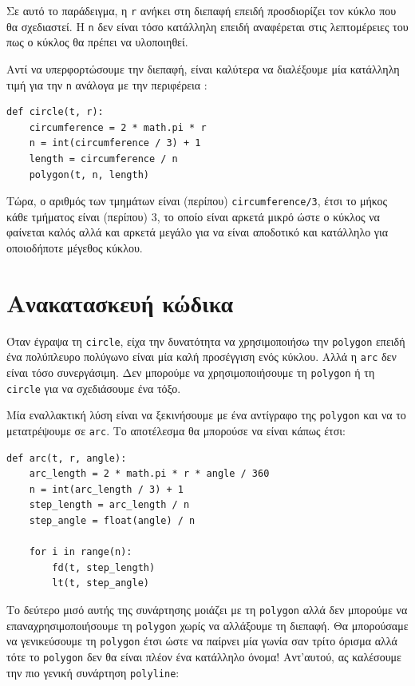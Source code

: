 \documentclass[10pt]{book}
\begin{document}
Σε αυτό το παράδειγμα, η {\tt r} ανήκει στη διεπαφή επειδή προσδιορίζει τον κύκλο που θα σχεδιαστεί. Η {\tt n} δεν είναι τόσο κατάλληλη επειδή αναφέρεται στις λεπτομέρειες του πως ο κύκλος θα πρέπει να υλοποιηθεί.

Αντί να υπερφορτώσουμε την διεπαφή, είναι καλύτερα να διαλέξουμε μία κατάλληλη
τιμή για την {\tt n} ανάλογα με την περιφέρεια :

\begin{verbatim}
def circle(t, r):
    circumference = 2 * math.pi * r
    n = int(circumference / 3) + 1
    length = circumference / n
    polygon(t, n, length)
\end{verbatim}
%

Τώρα, ο αριθμός των τμημάτων είναι (περίπου) {\tt circumference/3}, 
έτσι το μήκος κάθε τμήματος είναι (περίπου) 3, το οποίο είναι αρκετά μικρό ώστε
ο κύκλος να φαίνεται καλός αλλά και αρκετά μεγάλο για να είναι αποδοτικό και κατάλληλο για οποιοδήποτε μέγεθος κύκλου.


\section{Ανακατασκευή κώδικα}
\label{refactoring}

Όταν έγραψα τη {\tt circle}, είχα την δυνατότητα να χρησιμοποιήσω την {\tt polygon} επειδή ένα πολύπλευρο πολύγωνο είναι μία καλή προσέγγιση ενός κύκλου. Αλλά η {\tt arc} δεν είναι τόσο συνεργάσιμη. Δεν μπορούμε να χρησιμοποιήσουμε τη {\tt polygon} ή τη {\tt circle} για να σχεδιάσουμε ένα τόξο.

Μία εναλλακτική λύση είναι να ξεκινήσουμε με ένα αντίγραφο της {\tt polygon} και να το μετατρέψουμε σε {\tt arc}. Το αποτέλεσμα θα μπορούσε να είναι κάπως έτσι:

\begin{verbatim}
def arc(t, r, angle):
    arc_length = 2 * math.pi * r * angle / 360
    n = int(arc_length / 3) + 1
    step_length = arc_length / n
    step_angle = float(angle) / n

    for i in range(n):
        fd(t, step_length)
        lt(t, step_angle)
\end{verbatim}
%

Το δεύτερο μισό αυτής της συνάρτησης μοιάζει με τη {\tt polygon} αλλά
δεν μπορούμε να επαναχρησιμοποιήσουμε τη {\tt polygon} χωρίς να αλλάξουμε τη
διεπαφή. Θα μπορούσαμε να γενικεύσουμε τη {\tt polygon} έτσι ώστε να παίρνει μία γωνία σαν τρίτο όρισμα αλλά τότε το {\tt polygon} δεν θα είναι πλέον ένα κατάλληλο όνομα! Αντ'αυτού, ας καλέσουμε την πιο γενική συνάρτηση  {\tt polyline}:
\end{document}
